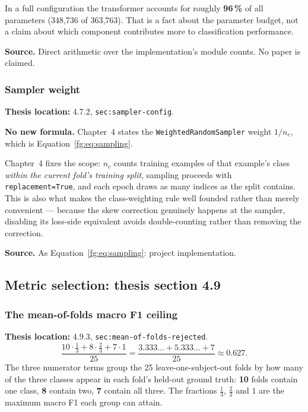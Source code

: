 \documentclass[11pt,a4paper]{article}
\numberwithin{equation}{section}
\begin{document}
In a full configuration the transformer accounts for roughly \textbf{96\,\%}
of all parameters (348,736 of 363,763). That is a fact about the parameter
budget, not a claim about which component contributes more to classification
performance.

\textbf{Source.} Direct arithmetic over the implementation's module counts.
No paper is claimed.

\subsubsection{Sampler weight}
\label{fg:sampler-ch4}
\textbf{Thesis location:} 4.7.2, \texttt{sec:sampler-config}.

\textbf{No new formula.} Chapter~4 states the \texttt{WeightedRandomSampler}
weight $1/n_c$, which is Equation~\eqref{fg:eq:sampling}.

Chapter~4 fixes the scope: $n_c$ counts training examples of that example's
class \emph{within the current fold's training split}, sampling proceeds with
\texttt{replacement=True}, and each epoch draws as many indices as the split
contains. This is also what makes the class-weighting rule well founded rather
than merely convenient --- because the skew correction genuinely happens at
the sampler, disabling its loss-side equivalent avoids double-counting rather
than removing the correction.

\textbf{Source.} As Equation~\eqref{fg:eq:sampling}: project implementation.

\subsection{Metric selection: thesis section 4.9}

\subsubsection{The mean-of-folds macro F1 ceiling}
\label{fg:fold-ceiling}
\textbf{Thesis location:} 4.9.3, \texttt{sec:mean-of-folds-rejected}.
\begin{equation}
	\frac{10 \cdot \tfrac13 + 8 \cdot \tfrac23 + 7 \cdot 1}{25} = \frac{3.333\ldots + 5.333\ldots + 7}{25} \approx 0.627.
    \label{fg:eq:fold-ceiling}
\end{equation}
The three numerator terms group the 25 leave-one-subject-out folds by how many
of the three classes appear in each fold's held-out ground truth:
\textbf{10} folds contain one class, \textbf{8} contain two, \textbf{7}
contain all three. The fractions $\tfrac13$, $\tfrac23$ and $1$ are the
maximum macro F1 each group can attain.
\end{document}
